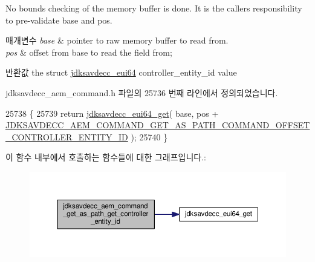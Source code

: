 No bounds checking of the memory buffer is done. It is the caller\textquotesingle{}s responsibility to pre-\/validate base and pos.


\begin{DoxyParams}{매개변수}
{\em base} & pointer to raw memory buffer to read from. \\
\hline
{\em pos} & offset from base to read the field from; \\
\hline
\end{DoxyParams}
\begin{DoxyReturn}{반환값}
the struct \hyperlink{structjdksavdecc__eui64}{jdksavdecc\+\_\+eui64} controller\+\_\+entity\+\_\+id value 
\end{DoxyReturn}


jdksavdecc\+\_\+aem\+\_\+command.\+h 파일의 25736 번째 라인에서 정의되었습니다.


\begin{DoxyCode}
25738 \{
25739     \textcolor{keywordflow}{return} \hyperlink{group__eui64_ga2652311a25a6b91cddbed75c108c7031}{jdksavdecc\_eui64\_get}( base, pos + 
      \hyperlink{group__command__get__as__path_ga535dac1cb8f1d06f5b21b0debe71a8a3}{JDKSAVDECC\_AEM\_COMMAND\_GET\_AS\_PATH\_COMMAND\_OFFSET\_CONTROLLER\_ENTITY\_ID}
       );
25740 \}
\end{DoxyCode}


이 함수 내부에서 호출하는 함수들에 대한 그래프입니다.\+:
\nopagebreak
\begin{figure}[H]
\begin{center}
\leavevmode
\includegraphics[width=350pt]{group__command__get__as__path_gaf78e95da00cc110176f22268de35f602_cgraph}
\end{center}
\end{figure}


